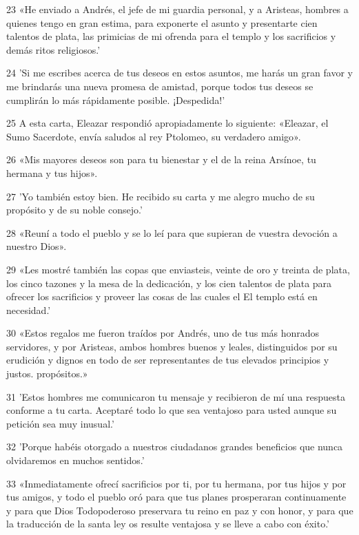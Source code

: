 \par 23 «He enviado a Andrés, el jefe de mi guardia personal, y a Aristeas, hombres a quienes tengo en gran estima, para exponerte el asunto y presentarte cien talentos de plata, las primicias de mi ofrenda para el templo y los sacrificios y demás ritos religiosos.'

\par 24 'Si me escribes acerca de tus deseos en estos asuntos, me harás un gran favor y me brindarás una nueva promesa de amistad, porque todos tus deseos se cumplirán lo más rápidamente posible. ¡Despedida!'

\par 25 A esta carta, Eleazar respondió apropiadamente lo siguiente: «Eleazar, el Sumo Sacerdote, envía saludos al rey Ptolomeo, su verdadero amigo».

\par 26 «Mis mayores deseos son para tu bienestar y el de la reina Arsínoe, tu hermana y tus hijos».

\par 27 'Yo también estoy bien. He recibido su carta y me alegro mucho de su propósito y de su noble consejo.'

\par 28 «Reuní a todo el pueblo y se lo leí para que supieran de vuestra devoción a nuestro Dios».

\par 29 «Les mostré también las copas que enviasteis, veinte de oro y treinta de plata, los cinco tazones y la mesa de la dedicación, y los cien talentos de plata para ofrecer los sacrificios y proveer las cosas de las cuales el El templo está en necesidad.'

\par 30 «Estos regalos me fueron traídos por Andrés, uno de tus más honrados servidores, y por Aristeas, ambos hombres buenos y leales, distinguidos por su erudición y dignos en todo de ser representantes de tus elevados principios y justos. propósitos.»

\par 31 'Estos hombres me comunicaron tu mensaje y recibieron de mí una respuesta conforme a tu carta. Aceptaré todo lo que sea ventajoso para usted aunque su petición sea muy inusual.'

\par 32 'Porque habéis otorgado a nuestros ciudadanos grandes beneficios que nunca olvidaremos en muchos sentidos.'

\par 33 «Inmediatamente ofrecí sacrificios por ti, por tu hermana, por tus hijos y por tus amigos, y todo el pueblo oró para que tus planes prosperaran continuamente y para que Dios Todopoderoso preservara tu reino en paz y con honor, y para que la traducción de la santa ley os resulte ventajosa y se lleve a cabo con éxito.'

